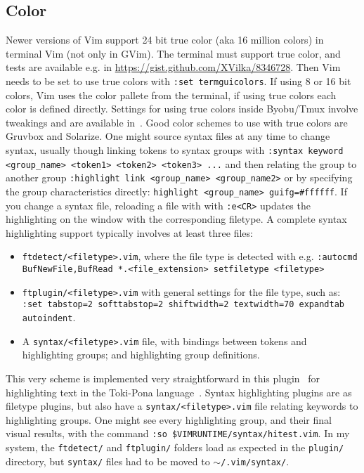\documentclass{article}
\newcommand{\tttt}[1]{\texttt{#1}}
\begin{document}
\subsection{Color}\label{visual2}
Newer versions of Vim support 24 bit true color (aka 16 million colors)
in terminal Vim (not only in GVim).
The terminal must support true color, and tests are available e.g. in
\url{https://gist.github.com/XVilka/8346728}.
Then Vim needs to be set to use true colors with
\tttt{:set termguicolors}.
If using 8 or 16 bit colors, Vim uses the color pallete from the
terminal, if using true colors each color is defined directly.
Settings for using true colors inside Byobu/Tmux involve tweakings
and are available in~\cite{vimrc}.
Good color schemes to use with true colors are Gruvbox
and Solarize.
One might source syntax files at any time to change syntax, usually
though linking tokens to syntax groups with
\tttt{:syntax keyword <group\_name> <token1> <token2> <token3> ...}
and then relating the group to another group 
\tttt{:highlight link <group\_name> <group\_name2>}
or by specifying the group characteristics directly:
\tttt{highlight <group\_name> guifg=\#ffffff}.
If you change a syntax file, reloading a file with with \tttt{:e<CR>}
updates the highlighting on the window with the corresponding filetype.
A complete syntax highlighting support typically involves at least three files:
\begin{itemize}
  \item \tttt{ftdetect/<filetype>.vim}, where the file type is
    detected with e.g.
    \tttt{:autocmd BufNewFile,BufRead *.<file\_extension> setfiletype <filetype>}
  \item \tttt{ftplugin/<filetype>.vim} with general settings for the
    file type, such as: 
    \tttt{:set tabstop=2 softtabstop=2 shiftwidth=2 textwidth=70
    expandtab autoindent}.
  \item A \tttt{syntax/<filetype>.vim} file, with bindings between
    tokens and highlighting groups; and highlighting group definitions.
\end{itemize}

This very scheme is implemented very straightforward in this
plugin~\cite{tokipona}
for highlighting text in the Toki-Pona language~\cite{tpLang}.
Syntax highlighting plugins are as filetype plugins,
but also have a \tttt{syntax/<filetype>.vim} file
relating keywords to highlighting groups. 
One might see every highlighting group, and their final visual results,
with the command
\tttt{:so \$VIMRUNTIME/syntax/hitest.vim}.
In my system, the \tttt{ftdetect/} and \tttt{ftplugin/} folders load as expected in the \tttt{plugin/}
directory, but \tttt{syntax/} files had to be moved to \tttt{$\sim$/.vim/syntax/}.
\end{document}
